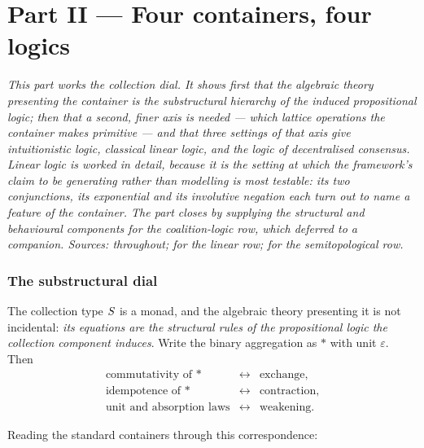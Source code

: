 \part*{Part II --- Four containers, four logics}

\bigskip
\noindent
\emph{This part works the collection dial. It shows first that the algebraic
theory presenting the container \emph{is} the substructural hierarchy of the
induced propositional logic; then that a second, finer axis is needed --- which
lattice operations the container makes primitive --- and that three settings of
that axis give intuitionistic logic, classical linear logic, and the logic of
decentralised consensus. Linear logic is worked in detail, because it is the
setting at which the framework's claim to be generating rather than modelling is
most testable: its two conjunctions, its exponential and its involutive negation
each turn out to name a feature of the container. The part closes by supplying
the structural and behavioural components for the coalition-logic row, which
\cite{Zeus} deferred to a companion. Sources: \cite{Zeus} throughout;
\cite{Girard87,Yetter90,Rosenthal90} for the linear row; \cite{Gabbay25,
GabbaySemiframes,QuorumNote,ConsensusTypes} for the semitopological row.}
\bigskip

\section{The substructural dial}
\label{sec:dial}

The collection type $S$ is a monad, and the algebraic theory presenting it is
not incidental: \emph{its equations are the structural rules of the propositional
logic the collection component induces}. Write the binary aggregation as $\ast$
with unit $\varepsilon$. Then
\[
\begin{array}{lll}
  \text{commutativity of } \ast & \longleftrightarrow & \text{exchange},\\[2pt]
  \text{idempotence of } \ast    & \longleftrightarrow & \text{contraction},\\[2pt]
  \text{unit and absorption laws}    & \longleftrightarrow & \text{weakening}.
\end{array}
\]

Reading the standard containers through this correspondence:

